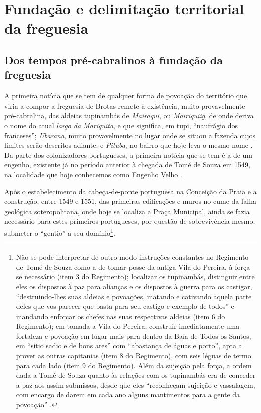 \section{Fundação e delimitação territorial da freguesia}\label{sec:2.1}

\subsection{Dos tempos pré-cabralinos à fundação da freguesia}\label{subsec:precabral}

A primeira notícia que se tem de qualquer forma de povoação do território que viria a compor a freguesia de Brotas remete à existência, muito provavelmente pré-cabralina, das aldeias tupinambás de \textit{Mairaqui}, ou \textit{Mairiquiig}, de onde deriva o nome do atual \textit{largo da Mariquita}, e que significa, em tupi, ``naufrágio dos franceses''; \textit{Ubarana}, muito provavelmente no lugar onde se situou a fazenda cujos limites serão descritos adiante; e \textit{Pituba}, no bairro que hoje leva o mesmo nome \cite{azevedo_povoamento_1969,dorea_ruas_1999,sampaio_salvador_2016,VASCONCELOS2002}. Da parte dos colonizadores portugueses, a primeira notícia que se tem é a de um engenho, existente já no período anterior à chegada de Tomé de Souza em 1549, na localidade que hoje conhecemos como Engenho Velho \cite[p.~235]{sampaio_salvador_2016}.

Após o estabelecimento da cabeça-de-ponte portuguesa na Conceição da Praia e a construção, entre 1549 e 1551, das primeiras edificações e muros no cume da falha geológica soteropolitana, onde hoje se localiza a Praça Municipal, ainda se fazia necessário para estes primeiros portugueses, por questão de sobrevivência mesmo, submeter o ``gentio'' a seu domínio\footnote{Não se pode interpretar de outro modo instruções constantes no Regimento de Tomé de Souza como a de tomar posse da antiga Vila do Pereira, à força se necessário (item 3 do Regimento); localizar os tupinambás, distinguir entre eles os dispostos à paz para alianças e os dispostos à guerra para os castigar, ``destruindo-lhes suas aldeias e povoações, matando e cativando aquela parte deles que vos parecer que basta para seu castigo e exemplo de todos'' e mandando enforcar os chefes nas suas respectivas aldeias (item 6 do Regimento); em tomada a Vila do Pereira, construir imediatamente uma fortaleza e povoação em lugar mais para dentro da Baía de Todos os Santos, em ``sítio sadio e de bons ares'' com ``abastança de águas e porto'', apta a prover as outras capitanias (item 8 do Regimento), com seis léguas de termo para cada lado (item 9 do Regimento). Além da sujeição pela força, a ordem dada a Tomé de Souza quanto às relações com os tupinambás era de conceder a paz aos assim submissos, desde que eles ``reconheçam sujeição e vassalagem, com encargo de darem em cada ano alguns mantimentos para a gente da povoação'' \cite[pp.~81-101]{ruy_politica_1949}.}.

